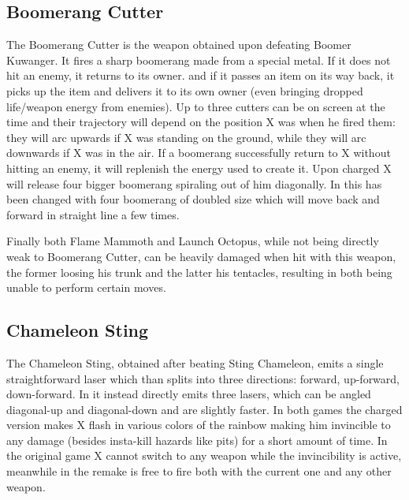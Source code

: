 \subsection{Boomerang Cutter}\label{Boomerang_cutter}
The Boomerang Cutter is the weapon obtained upon defeating Boomer Kuwanger. It fires a sharp boomerang made from a special metal. If it does not hit an enemy, it returns to its owner. and if it passes an item on its way back, it picks up the	item and delivers it to its own owner (even bringing dropped life/weapon energy from enemies). Up to three cutters can be on screen at the time\cite{wiki:Boomerang_cutter} and their trajectory will depend on the position X was when he fired them: they will arc upwards if X was standing on the ground, while they will arc downwards if X was in the air. If a boomerang successfully return to X without hitting an enemy, it will replenish the energy used to create it. Upon charged X will release four bigger boomerang spiraling out of him diagonally. In \mhx this has been changed with four boomerang of doubled size which will move back and forward in straight line a few times. 

Finally both Flame Mammoth and Launch Octopus, while not being directly weak to Boomerang Cutter, can be heavily damaged when hit with this weapon, the former loosing his trunk and the latter his tentacles, resulting in both being unable to perform certain moves.

\subsection{Chameleon Sting}\label{Chameleon_sting}
The Chameleon Sting, obtained after beating Sting Chameleon, emits a single straightforward laser which than splits into three directions: forward, up-forward, down-forward. In \mhx it instead directly emits three lasers, which can be angled diagonal-up and diagonal-down and are slightly faster. In both games the charged version makes X flash in various colors of the rainbow making him invincible to any damage (besides insta-kill hazards like pits) for a short amount of time. In the original game X cannot switch to any weapon while the invincibility is active, meanwhile in the remake is free to fire both with the current one and any other weapon\cite{wiki:Chameleon_sting}.

